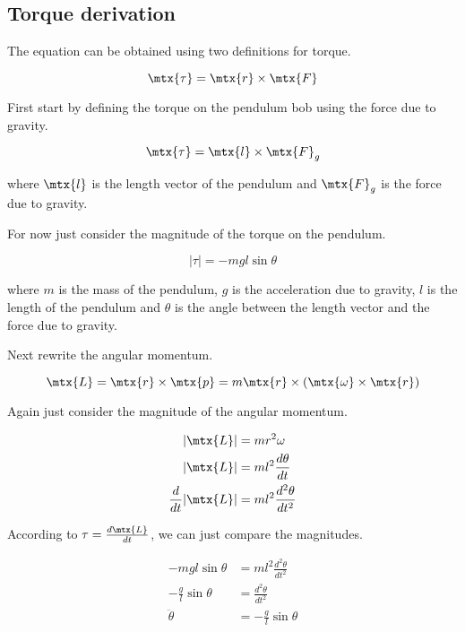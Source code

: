 \subsection{Torque derivation}

The equation can be obtained using two definitions for torque.

\begin{equation*}
  \mtx{\tau} = \mtx{r} \times \mtx{F}
\end{equation*}

First start by defining the torque on the pendulum bob using the force due to
gravity.

\begin{equation*}
  \mtx{\tau} = \mtx{l} \times \mtx{F}_g
\end{equation*}

where $\mtx{l}$ is the length vector of the pendulum and $\mtx{F}_g$ is the
force due to gravity.

For now just consider the magnitude of the torque on the pendulum.

\begin{equation*}
  \lvert\tau\rvert = -mgl\sin\theta
\end{equation*}

where $m$ is the mass of the pendulum, $g$ is the acceleration due to gravity,
$l$ is the length of the pendulum and $\theta$ is the angle between the length
vector and the force due to gravity.

Next rewrite the angular momentum.

\begin{equation*}
  \mtx{L} = \mtx{r} \times \mtx{p} =
    m\mtx{r} \times (\mtx{\omega} \times \mtx{r})
\end{equation*}

Again just consider the magnitude of the angular momentum.

\begin{align*}
  \lvert\mtx{L}\rvert &= mr^2\omega \\
  \lvert\mtx{L}\rvert &= ml^2 \frac{d\theta}{dt} \\
  \frac{d}{dt}\lvert\mtx{L}\rvert &= ml^2 \frac{d^2\theta}{dt^2}
\end{align*}

According to $\tau = \frac{d\mtx{L}}{dt}$, we can just compare the magnitudes.

\begin{align*}
  -mgl\sin\theta &= ml^2\frac{d^2\theta}{dt^2} \\
  -\frac{g}{l}\sin\theta &= \frac{d^2\theta}{dt^2} \\
  \ddot{\theta} &= -\frac{g}{l}\sin\theta
\end{align*}

